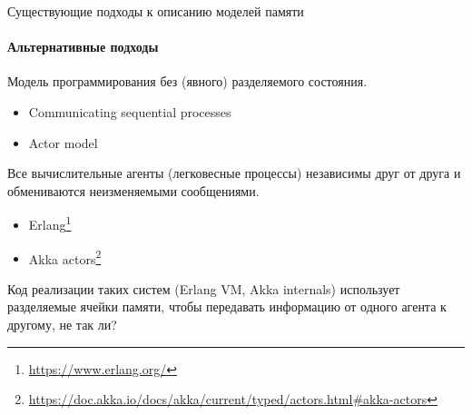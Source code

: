 \begin{frame}{Существующие подходы к описанию моделей памяти}
\framesubtitle{Альтернативные подходы}

Модель программирования без (явного) разделяемого состояния.
\pause
\begin{itemize}
	\item Communicating sequential processes
	\item Actor model
\end{itemize}

\pause
Все вычислительные агенты (легковесные процессы) независимы друг от друга и обмениваются неизменяемыми сообщениями.

\pause
\begin{itemize}
	\item Erlang\footnote<4->{\tiny\url{https://www.erlang.org/}}
	\item Akka actors\footnote<4->{\tiny\url{https://doc.akka.io/docs/akka/current/typed/actors.html#akka-actors}}
\end{itemize}

\pause
Код реализации таких систем (Erlang VM, Akka internals) использует разделяемые ячейки памяти, чтобы передавать информацию от одного агента к другому, не так ли?
\end{frame}


